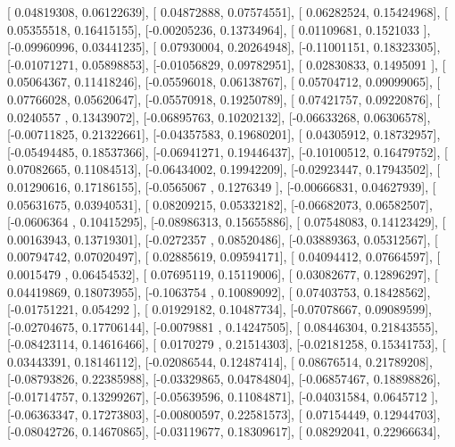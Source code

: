 \documentclass{article}
\begin{document}
       [ 0.04819308,  0.06122639],
       [ 0.04872888,  0.07574551],
       [ 0.06282524,  0.15424968],
       [ 0.05355518,  0.16415155],
       [-0.00205236,  0.13734964],
       [ 0.01109681,  0.1521033 ],
       [-0.09960996,  0.03441235],
       [ 0.07930004,  0.20264948],
       [-0.11001151,  0.18323305],
       [-0.01071271,  0.05898853],
       [-0.01056829,  0.09782951],
       [ 0.02830833,  0.1495091 ],
       [ 0.05064367,  0.11418246],
       [-0.05596018,  0.06138767],
       [ 0.05704712,  0.09099065],
       [ 0.07766028,  0.05620647],
       [-0.05570918,  0.19250789],
       [ 0.07421757,  0.09220876],
       [ 0.0240557 ,  0.13439072],
       [-0.06895763,  0.10202132],
       [-0.06633268,  0.06306578],
       [-0.00711825,  0.21322661],
       [-0.04357583,  0.19680201],
       [ 0.04305912,  0.18732957],
       [-0.05494485,  0.18537366],
       [-0.06941271,  0.19446437],
       [-0.10100512,  0.16479752],
       [ 0.07082665,  0.11084513],
       [-0.06434002,  0.19942209],
       [-0.02923447,  0.17943502],
       [ 0.01290616,  0.17186155],
       [-0.0565067 ,  0.1276349 ],
       [-0.00666831,  0.04627939],
       [ 0.05631675,  0.03940531],
       [ 0.08209215,  0.05332182],
       [-0.06682073,  0.06582507],
       [-0.0606364 ,  0.10415295],
       [-0.08986313,  0.15655886],
       [ 0.07548083,  0.14123429],
       [ 0.00163943,  0.13719301],
       [-0.0272357 ,  0.08520486],
       [-0.03889363,  0.05312567],
       [ 0.00794742,  0.07020497],
       [ 0.02885619,  0.09594171],
       [ 0.04094412,  0.07664597],
       [ 0.0015479 ,  0.06454532],
       [ 0.07695119,  0.15119006],
       [ 0.03082677,  0.12896297],
       [ 0.04419869,  0.18073955],
       [-0.1063754 ,  0.10089092],
       [ 0.07403753,  0.18428562],
       [-0.01751221,  0.054292  ],
       [ 0.01929182,  0.10487734],
       [-0.07078667,  0.09089599],
       [-0.02704675,  0.17706144],
       [-0.0079881 ,  0.14247505],
       [ 0.08446304,  0.21843555],
       [-0.08423114,  0.14616466],
       [ 0.0170279 ,  0.21514303],
       [-0.02181258,  0.15341753],
       [ 0.03443391,  0.18146112],
       [-0.02086544,  0.12487414],
       [ 0.08676514,  0.21789208],
       [-0.08793826,  0.22385988],
       [-0.03329865,  0.04784804],
       [-0.06857467,  0.18898826],
       [-0.01714757,  0.13299267],
       [-0.05639596,  0.11084871],
       [-0.04031584,  0.0645712 ],
       [-0.06363347,  0.17273803],
       [-0.00800597,  0.22581573],
       [ 0.07154449,  0.12944703],
       [-0.08042726,  0.14670865],
       [-0.03119677,  0.18309617],
       [ 0.08292041,  0.22966634],
\end{document}
